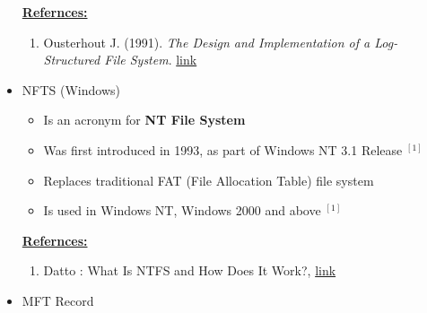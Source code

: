 \documentclass[12pt]{article}
\begin{document}
\begin{itemize}
    \bigskip

    \underline{\textbf{Refernces:}}

    \bigskip

    \begin{enumerate}[1)]
        \item Ousterhout J. (1991). \textit{The Design and Implementation of a Log-Structured File System}. \href{https://people.eecs.berkeley.edu/~brewer/cs262/LFS.pdf}{link}
    \end{enumerate}
    \item NFTS (Windows)
    \begin{itemize}
        \item Is an acronym for \textbf{NT File System}
        \item Was first introduced in 1993, as part of Windows NT 3.1 Release $^{[1]}$
        \item Replaces traditional FAT (File Allocation Table) file system
        \item Is used in Windows NT, Windows 2000 and above $^{[1]}$
    \end{itemize}

    \bigskip

    \underline{\textbf{Refernces:}}

    \bigskip

    \begin{enumerate}[1)]
        \item Datto : What Is NTFS and How Does It Work?, \href{https://www.datto.com/library/what-is-ntfs-and-how-does-it-work}{link}
    \end{enumerate}
    \item MFT Record
\end{itemize}
\end{document}
